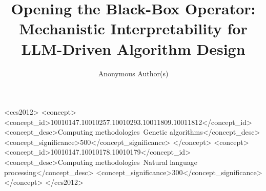 \documentclass[dvipsnames, format=sigconf, anonymous=true, review=true]{acmart}
\begin{document}
\title{Opening the Black-Box Operator: Mechanistic Interpretability for
  LLM-Driven Algorithm Design}

\author{Anonymous Author(s)}

\begin{abstract}

\end{abstract}

\begin{CCSXML}
<ccs2012>
<concept>
<concept_id>10010147.10010257.10010293.10011809.10011812</concept_id>
<concept_desc>Computing methodologies~Genetic algorithms</concept_desc>
<concept_significance>500</concept_significance>
</concept>
<concept>
<concept_id>10010147.10010178.10010179</concept_id>
<concept_desc>Computing methodologies~Natural language processing</concept_desc>
<concept_significance>300</concept_significance>
</concept>
</ccs2012>
\end{CCSXML}


\maketitle














\end{document}
